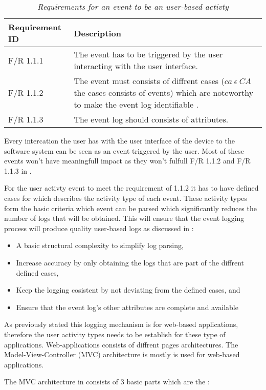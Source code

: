 \begin{table}[!htb]
	\centering
	\small
	\caption[Requirements for an event to be an user-based activty]
	{\textit{Requirements for an event to be an user-based activty}}
	\label{tbl:ch2_requirementsForUserActivtyEvent}
	\begin{tabularx}{\textwidth}{|l|X|}
		\hline \textbf{Requirement ID} & \textbf{Description}\\
		\hline F/R 1.1.1 & The event has to be triggered by the user interacting with the user interface. \\
		\hline F/R 1.1.2 & The event must consists of diffrent cases ($ca~ \epsilon~CA$ the cases consists of events) which are noteworthy to make the event log identifiable \cite{Slaninova2014}. \\
		\hline F/R 1.1.3 & The event log should consists of attributes. \\
		\hline
	\end{tabularx}
\end{table}

Every intercation the user has with the user interface of the device to the software system can be seen as an event triggered by the user. Most of these events won't have meaningfull impact as they won't fulfull F/R 1.1.2 and F/R 1.1.3 in .\par For the user activty event to meet the requirement of 1.1.2 it has to have defined cases for which describes the activity type of each event. These activity types form the basic criteria which event can be parsed which significantly reduces the number of logs that will be obtained. This will ensure that the event logging process will produce quality user-based logs as discussed in :

\begin{itemize}
	\item A basic structural complexity to simplify log parsing,
	\item Increase accuracy by only obtaining the logs that are part of the diffrent defined cases,
	\item Keep the logging cosistent by not deviating from the defined cases, and
	\item Ensure that the event log's other attributes are complete and available
\end{itemize}

\clearpage

As previously stated this logging mechanism is for web-based applications, therefore the user activity types needs to be establish for these type of applications. Web-applications consists of diffrent pages architectures. The Model-View-Controller (MVC) architecture is mostly is used for web-based applications.\par The MVC architecture in  consists of 3 basic parts which are the \cite{Jailia2016}:

